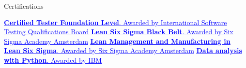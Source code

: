 \begin{rubric}{Certifications}

\entry*[2024]
\href{https://atsqa.org/certified-testers/profile/92007d7a02c74bd2abc44232ba4d53db}{\textcolor{blue}{\underline{\textbf{Certified Tester Foundation Level}. Awarded by International Software Testing Qualifications Board}}}
\entry*[2023]
\href{https://www.udemy.com/certificate/UC-ac01ca03-7dfb-43a1-94cc-7c90fb4f8fcf/}{\textcolor{blue}{\underline{\textbf{Lean Six Sigma Black Belt}. Awarded by Six Sigma Academy Amsterdam}}}
\entry*[2022] 
\href{https://www.udemy.com/certificate/UC-5d6415ed-0857-4a58-ad77-2fb8ad26f78e/}{\textcolor{blue}{\underline{\textbf{Lean Management and Manufacturing in Lean Six Sigma}. Awarded by Six Sigma Academy Amsterdam}}}
\entry*[2021]
\href{https://www.coursera.org/account/accomplishments/certificate/YMM5T73RZMFX}{\textcolor{blue}{\underline{\textbf{Data analysis with Python}. Awarded by IBM}}}

\end{rubric}